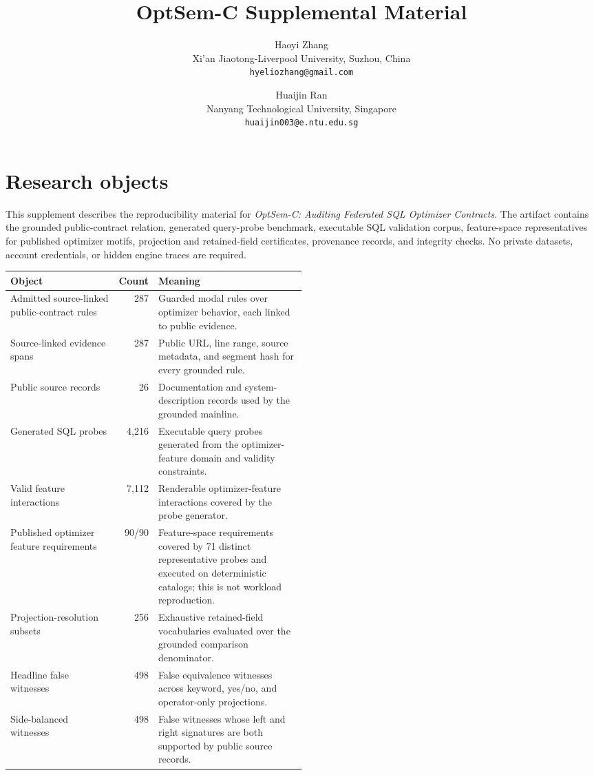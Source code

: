 \documentclass[10pt]{article}
\title{OptSem-C Supplemental Material}
\author{Haoyi Zhang\\
Xi'an Jiaotong-Liverpool University, Suzhou, China\\
\texttt{hyeliozhang@gmail.com}
\and
Huaijin Ran\\
Nanyang Technological University, Singapore\\
\texttt{huaijin003@e.ntu.edu.sg}}
\date{}
\begin{document}
\maketitle

\section*{Research objects}
This supplement describes the reproducibility material for \emph{OptSem-C: Auditing Federated SQL Optimizer Contracts}.  The artifact contains the grounded public-contract relation, generated query-probe benchmark, executable SQL validation corpus, feature-space representatives for published optimizer motifs, projection and retained-field certificates, provenance records, and integrity checks.  No private datasets, account credentials, or hidden engine traces are required.

\begin{center}
\small
\begin{tabular}{lrp{0.50\linewidth}}
\toprule
Object & Count & Meaning \\
\midrule
Admitted source-linked public-contract rules & 287 & Guarded modal rules over optimizer behavior, each linked to public evidence. \\
Source-linked evidence spans & 287 & Public URL, line range, source metadata, and segment hash for every grounded rule. \\
Public source records & 26 & Documentation and system-description records used by the grounded mainline. \\
Generated SQL probes & 4,216 & Executable query probes generated from the optimizer-feature domain and validity constraints. \\
Valid feature interactions & 7,112 & Renderable optimizer-feature interactions covered by the probe generator. \\
Published optimizer feature requirements & 90/90 & Feature-space requirements covered by 71 distinct representative probes and executed on deterministic catalogs; this is not workload reproduction. \\
Projection-resolution subsets & 256 & Exhaustive retained-field vocabularies evaluated over the grounded comparison denominator. \\
Headline false witnesses & 498 & False equivalence witnesses across keyword, yes/no, and operator-only projections. \\
Side-balanced witnesses & 498 & False witnesses whose left and right signatures are both supported by public source records. \\
\bottomrule
\end{tabular}
\end{center}
\end{document}
